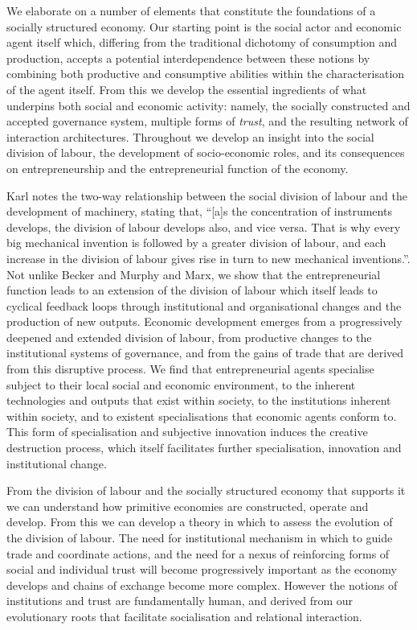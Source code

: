 We elaborate on a number of elements that constitute the foundations of a socially structured economy. Our starting point is the social actor and economic agent itself which, differing from the traditional dichotomy of consumption and production, accepts a potential interdependence between these notions by combining both productive and consumptive abilities within the characterisation of the agent itself. From this we develop the essential ingredients of what underpins both social and economic activity: namely, the socially constructed and accepted governance system, multiple forms of \emph{trust}, and the resulting network of interaction architectures. Throughout we develop an insight into the social division of labour, the development of socio-economic roles, and its consequences on entrepreneurship and the entrepreneurial function of the economy.

Karl \citet[p.~139]{Marx1847} notes the two-way relationship between the social division of labour and the development of machinery, stating that, ``[a]s the concentration of instruments develops, the division of labour develops also, and vice versa. That is why every big mechanical invention is followed by a greater division of labour, and each increase in the division of labour gives rise in turn to new mechanical inventions.''. Not unlike Becker and Murphy and Marx, we show that the entrepreneurial function leads to an extension of the division of labour which itself leads to cyclical feedback loops through institutional and organisational changes and the production of new outputs. Economic development emerges from a progressively deepened and extended division of labour, from productive changes to the institutional systems of governance, and from the gains of trade that are derived from this disruptive process. We find that entrepreneurial agents specialise subject to their local social and economic environment, to the inherent technologies and outputs that exist within society, to the institutions inherent within society, and to existent specialisations that economic agents conform to. This form of specialisation and subjective innovation induces the creative destruction process, which itself facilitates further specialisation, innovation and institutional change.

From the division of labour and the socially structured economy that supports it we can understand how primitive economies are constructed, operate and develop. From this we can develop a theory in which to assess the evolution of the division of labour. The need for institutional mechanism in which to guide trade and coordinate actions, and the need for a nexus of reinforcing forms of social and individual trust will become progressively important as the economy develops and chains of exchange become more complex. However the notions of institutions and trust are fundamentally human, and derived from our evolutionary roots that facilitate socialisation and relational interaction.

